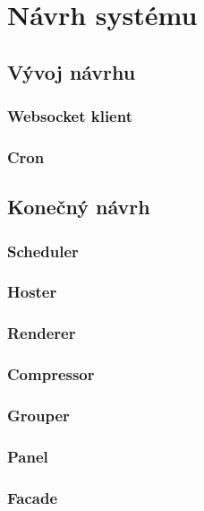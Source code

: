 \chapter{Návrh systému}



\section{Vývoj návrhu}
\subsection{Websocket klient}
\subsection{Cron}

\section{Konečný návrh}

    \subsection{Scheduler}
    \subsection{Hoster}
    \subsection{Renderer}
    \subsection{Compressor}
    \subsection{Grouper}
    \subsection{Panel}
    \subsection{Facade}